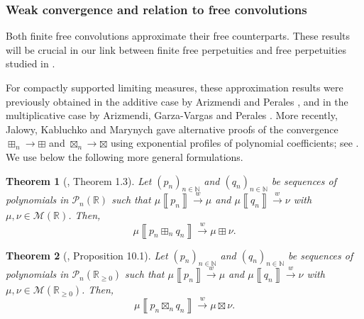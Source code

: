 \documentclass[a4paper,11pt]{amsart}
\numberwithin{equation}{section}
\newtheorem{theorem}{Theorem}[section]
\newcommand{\weak}{\xrightarrow{w}}
\newcommand{\N}{\mathbb{N}}
\newcommand{\R}{\mathbb{R}}
\newcommand{\pols}{\mathcal P}
\newcommand{\MM}{\mathcal{M}}
\newcommand{\meas}[1]{\mu\! \left\llbracket #1 \right\rrbracket}
\begin{document}
\subsubsection{Weak convergence and relation to free convolutions}

Both finite free convolutions approximate their free counterparts. These results will be crucial in our link between finite free perpetuities and free perpetuities studied in \cite{FreePerp}.


For compactly supported limiting measures, these approximation results were previously obtained in the additive case by Arizmendi and Perales \cite[Theorem~5.2 and Corollary~5.3]{AP18}, and in the multiplicative case by Arizmendi, Garza-Vargas and Perales \cite[Theorem~1.4]{AGP23}. More recently, Jalowy, Kabluchko and Marynych gave alternative proofs of the convergence $\boxplus_n\to\boxplus$ and $\boxtimes_n\to\boxtimes$ using exponential profiles of polynomial coefficients; see \cite[Theorems~3.5 and~3.7]{JKM25}. We use below the following more general formulations.

\begin{theorem}[\cite{Fujie25}, Theorem 1.3]
\label{thm:fujie}
Let $(p_n)_{n\in\N}$ and $(q_n)_{n\in\N}$ be sequences of polynomials in $\pols_n(\R)$ such that $\meas{p_n} \weak \mu$ and $\meas{q_n} \weak \nu$ with $\mu, \nu \in \MM(\R)$. Then, 
\[
\meas{p_n \boxplus_n q_n}\weak \mu \boxplus \nu.
\]
\end{theorem}

\begin{theorem}[\cite{AFPU24}, Proposition 10.1]
\label{prop:approx_boxtimesn}
Let $(p_n)_{n\in \N}$ and $(q_n)_{n\in \N}$ be sequences of polynomials in $\pols_n(\R_{\geq 0})$ such that $\meas{p_n} \weak \mu$ and $\meas{q_n} \weak \nu$ with $\mu, \nu \in \MM(\R_{\geq 0})$. Then,
\[ \meas{p_n \boxtimes_n q_n} \weak \mu \boxtimes \nu. \]
\end{theorem}
\end{document}
